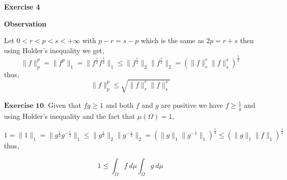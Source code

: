 \documentclass{article}
\begin{document}
\bigbreak

\begin{exercise}\textbf{Exercise 4}
    
\end{exercise}

\bigbreak

\begin{observation}\textbf{Observation}

Let $0 < r < p < s < +\infty$ with $p-r=s-p$ which is the same as $2p=r+s$ then using Holder's inequality we get,  
\[
    \|f\|_p^p = \|f^p\|_1 = \|f^{\frac{r}{2}}f^{\frac{s}{2}}\|_1 \le \|f^{\frac{r}{2}}\|_2 \|f^{\frac{s}{2}}\|_2 = \left( \|f\|_r^r \|f\|_s^s   \right)^{\frac{1}{2}}    
\]
thus,
\[
    \|f\|_p^p \le \sqrt{\|f\|_r^r \|f\|_s^s  }   
\]
\end{observation}

\bigbreak

\begin{exercise}$\textbf{Exercise 10.}$
Given that $fg\ge1$ and both $f$ and $g$ are positive we have $f \ge \frac{1}{g}$ and using Holder's inequality and the fact that $\mu\left(\Omega\right)=1$,

\[
    1 = \|1\|_1 = \|g^{\frac{1}{2}}g^{-\frac{1}{2}}\|_1 \le \|g^{\frac{1}{2}}\|_2 \|g^{-\frac{1}{2}}\|_2 =  \left( \|g\|_1 \|g^{-1}\|_1 \right) ^{\frac{1}{2}} \le \left(\|g\|_1 \|f\|_1 \right)^{\frac{1}{2}} 
\]
thus,

\[
    1 \le \int_\Omega f\: d\mu \int_\Omega g\: d\mu  
\]

\end{exercise}
\end{document}
